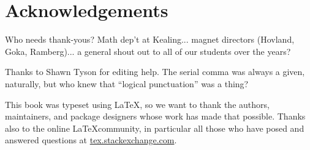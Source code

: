 \chapter{Acknowledgements}
\label{ch:acknowledgements}

Who needs thank-yous? Math dep't at Kealing... magnet directors (Hovland, Goka, Ramberg)... a general shout out to all of our students over the years?

Thanks to Shawn Tyson for editing help. The serial comma was always a given, naturally, but who knew that ``logical punctuation'' was a thing?

This book was typeset using \LaTeX, so we want to thank the authors, maintainers, and package designers whose work has made that possible. Thanks also to the online \LaTeX community, in particular all those who have posed and answered questions at \href{http://tex.stackexchange.com/}{tex.stackexchange.com}.
